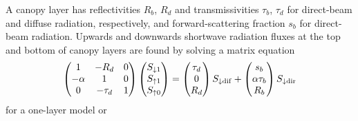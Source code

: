 \documentclass[fleqn]{article}
\begin{document}
A canopy layer has reflectivities $R_b$, $R_d$ and transmissivities $\tau_b$, $\tau_d$ for direct-beam and diffuse radiation, respectively, and forward-scattering fraction $s_b$ for direct-beam radiation. Upwards and downwards shortwave radiation fluxes at the top and bottom of canopy layers are found by solving a matrix equation
\begin{equation}
\begin{pmatrix}
1       & -R_d     & 0 \\
-\alpha & 1        & 0 \\
0       & -\tau_d  & 1 \\
\end{pmatrix}
\begin{pmatrix}
S_{\downarrow 1} \\
S_{\uparrow 1}   \\
S_{\uparrow 0}   \\
\end{pmatrix}
=
\begin{pmatrix}
\tau_d  \\
0       \\
R_d     \\
\end{pmatrix}
S_{\downarrow\rm dif} +
\begin{pmatrix}
s_b           \\
\alpha\tau_b  \\
R_b           \\
\end{pmatrix}
S_{\downarrow\rm dir}
\label{eq:canmod1}
\end{equation}
for a one-layer model or
\end{document}
